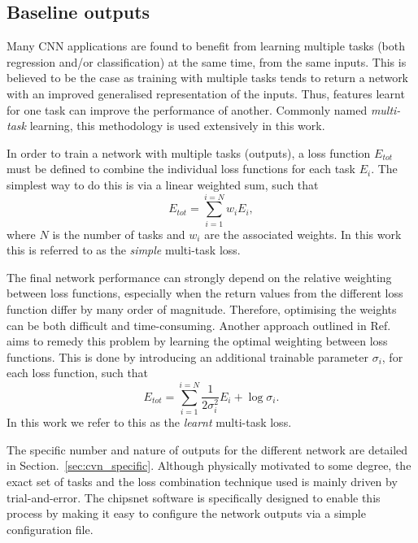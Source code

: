\subsection{Baseline outputs} %
\label{sec:cvn_baseline_outputs} %

Many CNN applications are found to benefit from learning multiple tasks (both regression and/or
classification) at the same time, from the same inputs. This is believed to be the case as
training with multiple tasks tends to return a network with an improved generalised representation
of the inputs. Thus, features learnt for one task can improve the performance of another. Commonly
named \emph{multi-task} learning, this methodology is used extensively in this work.

In order to train a network with multiple tasks (outputs), a loss function $E_{tot}$ must be
defined to combine the individual loss functions for each task $E_{i}$. The simplest way to do
this is via a linear weighted sum, such that
\begin{equation}
    E_{tot} = \sum_{i=1}^{i=N}w_{i}E_{i},
    \label{eq:multi_simple}
\end{equation}
where $N$ is the number of tasks and $w_{i}$ are the associated weights. In this work this is
referred to as the \emph{simple} multi-task loss.

The final network performance can strongly depend on the relative weighting between loss
functions, especially when the return values from the different loss function differ by many order
of magnitude. Therefore, optimising the weights can be both difficult and time-consuming. Another
approach outlined in Ref.~\cite{kendall2018} aims to remedy this problem by learning the optimal
weighting between loss functions. This is done by introducing an additional trainable parameter
$\sigma_{i}$, for each loss function, such that
\begin{equation}
    E_{tot}= \sum_{i=1}^{i=N}\frac{1}{2\sigma_{i}^2}E_{i}+ \log\sigma_{i}.
    \label{eq:multi_learnt}
\end{equation}
In this work we refer to this as the \emph{learnt} multi-task loss.

The specific number and nature of outputs for the different network are detailed in
Section.~\ref{sec:cvn_specific}. Although physically motivated to some degree, the exact set of
tasks and the loss combination technique used is mainly driven by trial-and-error. The chipsnet
software is specifically designed to enable this process by making it easy to configure the
network outputs via a simple configuration file.

